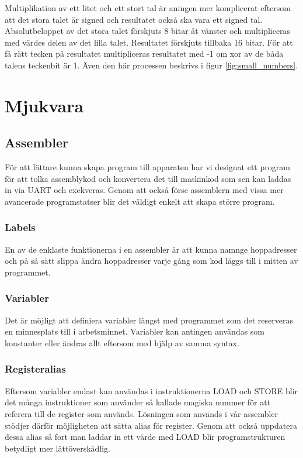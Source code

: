 \documentclass[a4paper]{article}
\begin{document}
    Multiplikation av ett litet och ett stort tal är aningen mer komplicerat
    eftersom att det stora talet är signed och resultatet också ska vara ett
    signed tal. Absolutbeloppet av det stora talet förskjuts 8 bitar åt vänster
    och multipliceras med värdes delen av det lilla talet. Resultatet förskjuts
    tillbaka 16 bitar. För att få rätt tecken på resultatet multipliceras
    resultatet med -1 om xor av de båda talens teckenbit är 1. Även den här
    processen beskrivs i figur \ref{fig:small_numbers}.




    \section{Mjukvara}
    \subsection{Assembler}

    För att lättare kunna skapa program till apparaten har vi designat ett program
    för att tolka assemblykod och konvertera det till maskinkod som sen kan laddas
    in via UART och exekveras. Genom att också förse assemblern med vissa mer
    avancerade programstatser blir det väldigt enkelt att skapa större program. 

    \subsubsection{Labels}
    En av de enklaste funktionerna i en assembler är att kunna namnge hoppadresser
    och på så sätt slippa ändra hoppadresser varje gång som kod läggs till i mitten
    av programmet. 

    \subsubsection{Variabler}
    Det är möjligt att definiera variabler längst med programmet som det
    reserveras en minnesplats till i arbetsminnet. Variabler kan antingen
    användas som konstanter eller ändras allt eftersom med hjälp av samma
    syntax. 
    \subsubsection{Registeralias}
    Eftersom variabler endast kan användas i instruktionerna LOAD och STORE blir
    det många instruktioner som använder så kallade magiska nummer för att
    referera till de register som används. Lösningen som används i vår assembler
    stödjer därför möjligheten att sätta alias för register. Genom att också
    uppdatera dessa alias så fort man laddar in ett värde med LOAD blir
    programstrukturen betydligt mer lättöverskådlig. 
\end{document}
